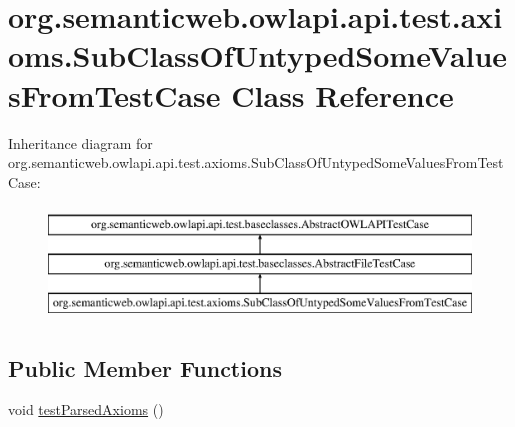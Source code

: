 \hypertarget{classorg_1_1semanticweb_1_1owlapi_1_1api_1_1test_1_1axioms_1_1_sub_class_of_untyped_some_values_from_test_case}{\section{org.\-semanticweb.\-owlapi.\-api.\-test.\-axioms.\-Sub\-Class\-Of\-Untyped\-Some\-Values\-From\-Test\-Case Class Reference}
\label{classorg_1_1semanticweb_1_1owlapi_1_1api_1_1test_1_1axioms_1_1_sub_class_of_untyped_some_values_from_test_case}
}
Inheritance diagram for org.\-semanticweb.\-owlapi.\-api.\-test.\-axioms.\-Sub\-Class\-Of\-Untyped\-Some\-Values\-From\-Test\-Case\-:\begin{figure}[H]
\begin{center}
\leavevmode
\includegraphics[height=3.000000cm]{classorg_1_1semanticweb_1_1owlapi_1_1api_1_1test_1_1axioms_1_1_sub_class_of_untyped_some_values_from_test_case}
\end{center}
\end{figure}
\subsection*{Public Member Functions}
\begin{DoxyCompactItemize}
\item 
void \hyperlink{classorg_1_1semanticweb_1_1owlapi_1_1api_1_1test_1_1axioms_1_1_sub_class_of_untyped_some_values_from_test_case_a0927465feab21236c85e5b9f567188ae}{test\-Parsed\-Axioms} ()
\end{DoxyCompactItemize}
